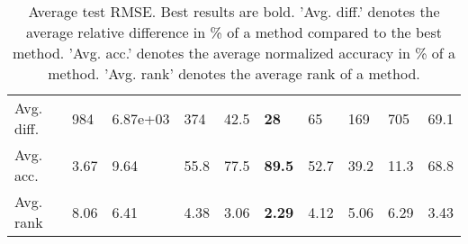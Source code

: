 \begin{table}[ht!]
\begin{tabular}{llllllllll}
   \hline
Avg. diff. & 984 & 6.87e+03 & 374 & 42.5 & \textbf{28} & 65 & 169 & 705 & 69.1 \\ 
  Avg. acc. & 3.67 & 9.64 & 55.8 & 77.5 & \textbf{89.5} & 52.7 & 39.2 & 11.3 & 68.8 \\ 
  Avg. rank & 8.06 & 6.41 & 4.38 & 3.06 & \textbf{2.29} & 4.12 & 5.06 & 6.29 & 3.43 \\ 
   \hline
\hline
\end{tabular}
\endgroup
\caption{Average test RMSE. 
                  Best results are bold. 
                  'Avg. diff.' denotes the average relative difference in \% of a method compared to the best method.
                  'Avg. acc.' denotes the average normalized accuracy in \% of a method.
                  'Avg. rank' denotes the average rank of a method.} 
\label{TABLES/table_results_RMSE_umap}
\end{table}
